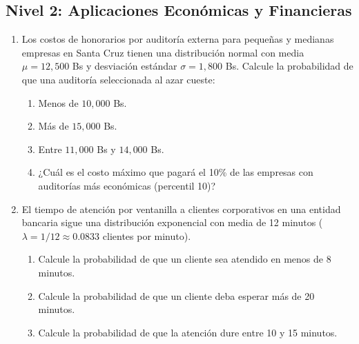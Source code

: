 \subsection*{Nivel 2: Aplicaciones Económicas y Financieras}
\begin{enumerate}[resume]
    \item Los costos de honorarios por auditoría externa para pequeñas y medianas empresas en Santa Cruz tienen una distribución normal con media $\mu = 12{,}500$ Bs y desviación estándar $\sigma = 1{,}800$ Bs. Calcule la probabilidad de que una auditoría seleccionada al azar cueste:
    \begin{enumerate}[label=\alph*)]
        \item Menos de $10{,}000$ Bs.
        \item Más de $15{,}000$ Bs.
        \item Entre $11{,}000$ Bs y $14{,}000$ Bs.
        \item ¿Cuál es el costo máximo que pagará el 10\% de las empresas con auditorías más económicas (percentil 10)?
    \end{enumerate}
    \item El tiempo de atención por ventanilla a clientes corporativos en una entidad bancaria sigue una distribución exponencial con media de 12 minutos ($\lambda = 1/12 \approx 0.0833$ clientes por minuto).
    \begin{enumerate}[label=\alph*)]
        \item Calcule la probabilidad de que un cliente sea atendido en menos de 8 minutos.
        \item Calcule la probabilidad de que un cliente deba esperar más de 20 minutos.
        \item Calcule la probabilidad de que la atención dure entre 10 y 15 minutos.
    \end{enumerate}
\end{enumerate}

